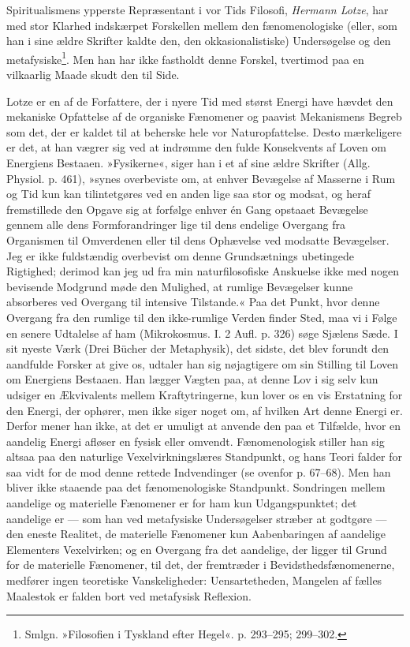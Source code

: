 \documentclass[12pt,a4paper,openany]{book}
\newcommand{\opage}[1]{\marginnote{\footnotesize\textit{[#1]}}}
\begin{document}
Spiritualismens ypperste Repræsentant i vor Tids Filosofi, \emph{Hermann
Lotze}, har med stor Klarhed indskærpet Forskellen mellem den
fænomenologiske (eller, som han i sine ældre Skrifter kaldte den, den
okkasionalistiske) Undersøgelse og den metafysiske\footnote[1]{Smlgn.
»Filosofien i Tyskland efter Hegel«. p. 293--295; 299--302.}. Men han har
ikke fastholdt denne Forskel, tvertimod paa en vilkaarlig Maade skudt
den til Side.

Lotze er en af de Forfattere, der i nyere Tid med størst Energi have
hævdet den mekaniske Opfattelse af de organiske Fænomener og paavist
Mekanismens Begreb som det, der er kaldet til at beherske hele vor
Naturopfattelse. Desto mærkeligere er det, at han vægrer sig ved at
indrømme den fulde Konsekvents af Loven om Energiens Bestaaen.
»Fysikerne«, siger han i et af sine ældre Skrifter (Allg. Physiol. p.
461), »synes overbeviste om, at enhver Bevægelse af Masserne i Rum og
Tid kun kan tilintetgøres ved en anden lige saa stor og modsat, og heraf
fremstillede den Opgave sig at forfølge enhver én Gang opstaaet
Bevægelse gennem alle dens Formforandringer lige til dens endelige
Overgang fra Organismen til Omverdenen eller til dens Ophævelse ved
modsatte Bevægelser. Jeg er ikke fuldstændig overbevist om denne
Grundsætnings ubetingede Rigtighed; derimod kan jeg ud fra min
naturfilosofiske Anskuelse ikke med nogen bevisende Modgrund møde den
Mulighed, at rumlige Bevægelser kunne absorberes ved Overgang til
intensive Tilstande.« Paa det Punkt, hvor denne Overgang fra den rumlige
til den ikke-rumlige Verden finder Sted, maa vi i Følge en senere
Udtalelse af ham (Mikrokosmus. I. 2 Aufl. p. 326) søge Sjælens Sæde. I
sit nyeste Værk (Drei Bücher
\opage{76}der Metaphysik), det sidste, det blev forundt den aandfulde
Forsker at give os, udtaler han sig nøjagtigere om sin Stilling til
Loven om Energiens Bestaaen. Han lægger Vægten paa, at denne Lov i sig
selv kun udsiger en Ækvivalents mellem Kraftytringerne, kun lover os en
vis Erstatning for den Energi, der ophører, men ikke siger noget om, af
hvilken Art denne Energi er. Derfor mener han ikke, at det er umuligt at
anvende den paa et Tilfælde, hvor en aandelig Energi afløser en fysisk
eller omvendt. Fænomenologisk stiller han sig altsaa paa den naturlige
Vexelvirkningslæres Standpunkt, og hans Teori falder for saa vidt for de
mod denne rettede Indvendinger (se ovenfor p. 67--68). Men han bliver
ikke staaende paa det fænomenologiske Standpunkt. Sondringen mellem
aandelige og materielle Fænomener er for ham kun Udgangspunktet; det
aandelige er --- som han ved metafysiske Undersøgelser stræber at
godtgøre --- den eneste Realitet, de materielle Fænomener kun
Aabenbaringen af aandelige Elementers Vexelvirken; og en Overgang fra
det aandelige, der ligger til Grund for de materielle Fænomener, til
det, der fremtræder i Bevidsthedsfænomenerne, medfører ingen teoretiske
Vanskeligheder: Uensartetheden, Mangelen af fælles Maalestok er falden
bort ved metafysisk Reflexion.
\end{document}
